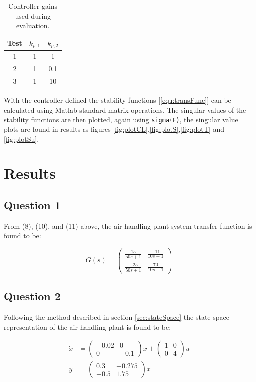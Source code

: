 \documentclass[a4paper, titlepage]{article}
\begin{document}
\begin{table}[h!]
\begin{center}
\begin{tabular}{||c | c c||}
 \hline
 Test & $k_{p,1}$ & $k_{p,2}$ \\ [0.5ex] 
 \hline\hline
 1 &  1 & 1 \\ 
 \hline
 2 &  1 & 0.1 \\
 \hline
 3 &  1 & 10 \\
 \hline
\end{tabular}
\end{center}
\caption{Controller gains used during evaluation.}
\label{tab:gains}
\end{table}

With the controller defined the stability functions [\ref{equ:transFunc}] can be calculated using Matlab standard matrix operations.
The singular values of the stability functions are then plotted, again using \verb|sigma(F)|, the singular value plots are found in results as figures \ref{fig:plotCL},\ref{fig:plotS},\ref{fig:plotT} and \ref{fig:plotSu}.

\section{Results}

\subsection{Question 1}
From (8), (10), and (11) above, the air handling plant system transfer function is found to be:

\begin{equation}
G(s)
=
\begin{pmatrix}
\frac{15}{50s + 1} & \frac{-11}{10s + 1} \\ \frac{-25}{50s + 1} & \frac{70}{10s + 1}
\end{pmatrix}
\label{equ:airPlantResult}
\end{equation}

\subsection{Question 2}
Following the method described in section \ref{sec:stateSpace} the state space representation of the air handling plant is found to be:

\begin{equation}
\begin{split}
\dot{x} &= 
\begin{pmatrix}
-0.02 & 0 \\ 0 & -0.1
\end{pmatrix}x
+
\begin{pmatrix}
1 & 0 \\ 0 & 4
\end{pmatrix}u \\
y &= 
\begin{pmatrix}
0.3 & -0.275 \\ -0.5 & 1.75
\end{pmatrix}x
\end{split}
\label{equ:ssSolution}
\end{equation}
\end{document}
